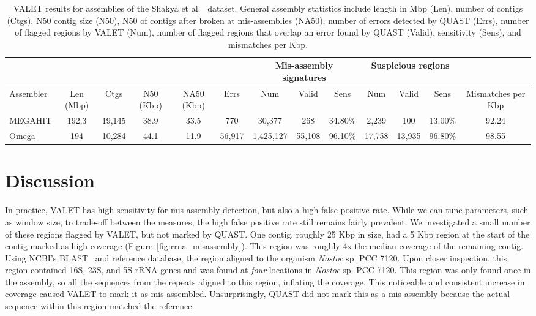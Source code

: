 \documentclass[12pt,\mydriver]{thesis}
\begin{document}
\begin{landscape}
\renewcommand{\baselinestretch}{1}
\small\normalsize
\begin{table}[tb!]
\centering
\footnotesize
\label{synthetic_valet}
\begin{tabular}{|l|c|c|c|c|c|c|c|c|c|c|c|c|}
  \hline
  \multicolumn{6}{|c}{} & \multicolumn{3}{|c|}{Mis-assembly signatures} & \multicolumn{3}{c|}{Suspicious regions}   &  \\
  \hline
  Assembler & Len (Mbp) & Ctgs   & N50 (Kbp) & NA50 (Kbp) & Errs   & Num       & Valid  & Sens    & Num    & Valid  & Sens    & Mismatches per Kbp \\
  \hline
  MEGAHIT   & 192.3     & 19,145 & 38.9      & 33.5       & 770    & 30,377    & 268    & 34.80\% & 2,239  & 100    & 13.00\% & 92.24              \\
  Omega     & 194       & 10,284 & 44.1      & 11.9       & 56,917 & 1,425,127 & 55,108 & 96.10\% & 17,758 & 13,935 & 96.80\% & 98.55 \\
  \hline
\end{tabular}
\caption[VALET results for assemblies of the Shakya et al.~\cite{shakya2013comparative} dataset]{VALET results for assemblies of the Shakya et al.~\cite{shakya2013comparative} dataset. General assembly statistics include length in Mbp (Len), number of contigs (Ctgs), N50 contig size (N50), N50 of contigs after broken at mis-assemblies (NA50), number of errors detected by QUAST (Errs), number of flagged regions by VALET (Num), number of flagged regions that overlap an error found by QUAST (Valid), sensitivity (Sens), and mismatches per Kbp.}
\end{table}
\renewcommand{\baselinestretch}{2}
\small\normalsize
\end{landscape}


\section{Discussion}


In practice, VALET has high sensitivity for mis-assembly detection, but also a high false positive rate.
While we can tune parameters, such as window size, to trade-off between the measures, the high false positive rate still remains fairly prevalent.
We investigated a small number of these regions flagged by VALET, but not marked by QUAST.
One contig, roughly 25 Kbp in size, had a 5 Kbp region at the start of the contig marked as high coverage (Figure~\ref{fig:rrna_misassembly}).
This region was roughly 4x the median coverage of the remaining contig.
Using NCBI's BLAST~\cite{blast} and reference database, the region aligned to the organism \emph{Nostoc} sp. PCC 7120.
Upon closer inspection, this region contained 16S, 23S, and 5S rRNA genes and was found at \emph{four} locations in  \emph{Nostoc} sp. PCC 7120.
This region was only found once in the assembly, so all the sequences from the repeats aligned to this region, inflating the coverage.
This noticeable and consistent increase in coverage caused VALET to mark it as mis-assembled.
Unsurprisingly, QUAST did not mark this as a mis-assembly because the actual sequence within this region matched the reference.
\end{document}
